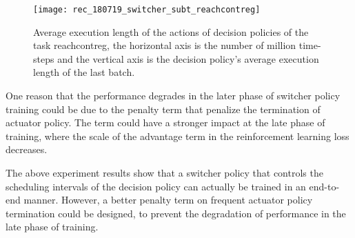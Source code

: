 \begin{figure}[!htbp]
	\centering
	\texttt{[image: rec\_180719\_switcher\_subt\_reachcontreg]}
	\caption{Average execution length of the actions of decision policies of the task reachcontreg, the horizontal axis is the number of million time-steps and the vertical axis is the decision policy's average execution length of the last batch.}
	\label{rec_switcher_subt_reachcontreg}
\end{figure}

One reason that the performance degrades in the later phase of switcher policy training could be due to the penalty term that penalize the termination of actuator policy. The term could have a stronger impact at the late phase of training, where the scale of the advantage term in the reinforcement learning loss decreases.

The above experiment results show that a switcher policy that controls the scheduling intervals of the decision policy can actually be trained in an end-to-end manner. However, a better penalty term on frequent actuator policy termination could be designed, to prevent the degradation of performance in the late phase of training. 